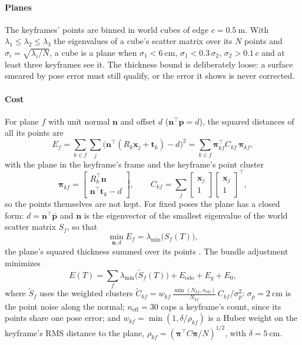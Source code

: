 \paragraph{Planes} The keyframes' points are binned in world cubes of edge
$c=\SI{0.5}{\metre}$. With $\lambda_1\le\lambda_2\le\lambda_3$ the
eigenvalues of a cube's scatter matrix over its $N$ points and
$\sigma_i=\sqrt{\lambda_i/N}$, a cube is a plane when
$\sigma_1<\SI{6}{\centi\metre}$, $\sigma_1<0.3\,\sigma_2$,
$\sigma_2>0.1\,c$ and at least three keyframes see it. The thickness bound
is deliberately loose: a surface smeared by pose error must still qualify,
or the error it shows is never corrected.

\paragraph{Cost} For plane $f$ with unit normal $\mathbf n$ and offset $d$
($\mathbf n^\top\mathbf p=d$), the squared distances of all its points are
\begin{equation}
E_f=\sum_{k\in f}\sum_{j}\big(\mathbf n^\top(R_k\mathbf x_j+\mathbf t_k)-d\big)^2
   =\sum_{k\in f}\boldsymbol\pi_{kf}^\top C_{kf}\,\boldsymbol\pi_{kf},
\end{equation}
with the plane in the keyframe's frame and the keyframe's point cluster
\begin{equation}
\boldsymbol\pi_{kf}=\begin{bmatrix}R_k^\top\mathbf n\\ \mathbf n^\top\mathbf t_k-d\end{bmatrix},\qquad
C_{kf}=\sum_j\begin{bmatrix}\mathbf x_j\\1\end{bmatrix}\begin{bmatrix}\mathbf x_j\\1\end{bmatrix}^\top ,
\end{equation}
so the points themselves are not kept. For fixed poses the plane has a
closed form: $d=\mathbf n^\top\bar{\mathbf p}$ and $\mathbf n$ is the
eigenvector of the smallest eigenvalue of the world scatter matrix $S_f$,
so that
\begin{equation}
\min_{\mathbf n,d}E_f=\lambda_{\min}\big(S_f(T)\big),
\end{equation}
the plane's squared thickness summed over its points \cite{balm}. The
bundle adjustment minimizes
\begin{equation}
E(T)=\sum_f\lambda_{\min}\big(\tilde S_f(T)\big)+E_{\mathrm{odo}}+E_{g}+E_{0},
\label{eq:ba}
\end{equation}
where $\tilde S_f$ uses the weighted clusters
$\tilde C_{kf}=w_{kf}\,\tfrac{\min(N_{kf},n_{\mathrm{eff}})}{N_{kf}}\,C_{kf}/\sigma_p^2$:
$\sigma_p=\SI{2}{\centi\metre}$ is the point noise along the normal;
$n_{\mathrm{eff}}=30$ caps a keyframe's count, since its points share one
pose error; and $w_{kf}=\min(1,\delta/\rho_{kf})$ is a Huber weight on the
keyframe's RMS distance to the plane,
$\rho_{kf}=(\boldsymbol\pi^\top C\boldsymbol\pi/N)^{1/2}$, with
$\delta=\SI{5}{\centi\metre}$.

